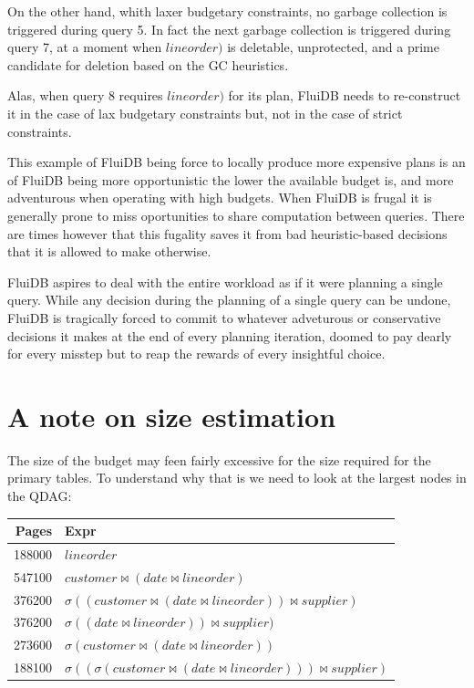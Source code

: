 On the other hand, whith laxer budgetary constraints, no garbage
collection is triggered during query 5. In fact the next garbage
collection is triggered during query 7, at a moment when
\(\mathit{lineorder})\) is deletable, unprotected, and a prime
candidate for deletion based on the GC heuristics.

Alas, when query 8 requires \(\mathit{lineorder})\) for its plan,
FluiDB needs to re-construct it in the case of lax budgetary
constraints but, not in the case of strict constraints.

This example of FluiDB being force to locally produce more expensive
plans is an of FluiDB being more opportunistic the lower the available
budget is, and more adventurous when operating with high budgets. When
FluiDB is frugal it is generally prone to miss oportunities to share
computation between queries. There are times however that this
fugality saves it from bad heuristic-based decisions that it is
allowed to make otherwise.

FluiDB aspires to deal with the entire workload as if it were planning
a single query. While any decision during the planning of a single
query can be undone, FluiDB is tragically forced to commit to whatever
adveturous or conservative decisions it makes at the end of every
planning iteration, doomed to pay dearly for every misstep but to reap
the rewards of every insightful choice.

\section{A note on size estimation}
\label{sec:size_estimation_problems}
The size of the budget may feen fairly excessive for the size required
for the primary tables. To understand why that is we need to look at
the largest nodes in the QDAG:

\begin{center}
\begin{tabular}{rl}
Pages & Expr\\
\hline
188000 & \(lineorder\)\\
547100 & \(customer \Join (date \Join lineorder)\)\\
376200 & \(\sigma ((customer \Join (date \Join lineorder)) \Join supplier)\)\\
376200 & \(\sigma ((date \Join lineorder)) \Join supplier)\)\\
273600 & \(\sigma (customer \Join (date \Join lineorder))\)\\
188100 & \(\sigma ((\sigma (customer \Join (date \Join lineorder))) \Join supplier)\)\\
\end{tabular}
\end{center}

